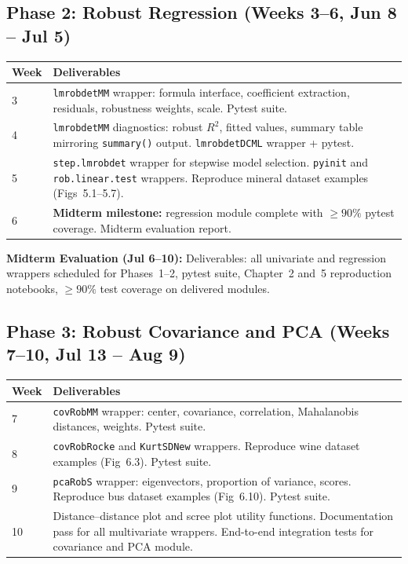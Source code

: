 \documentclass[11pt, a4paper]{article}
\begin{document}
\subsection{Phase 2: Robust Regression (Weeks 3--6, Jun 8 -- Jul 5)}

\begin{tabularx}{\linewidth}{@{} l X @{}}
  \toprule
  \textbf{Week} & \textbf{Deliverables} \\
  \midrule
  3 & \texttt{lmrobdetMM} wrapper: formula interface, coefficient
    extraction, residuals, robustness weights, scale.
    Pytest suite. \\
  4 & \texttt{lmrobdetMM} diagnostics: robust $R^2$, fitted values,
    summary table mirroring \texttt{summary()} output.
    \texttt{lmrobdetDCML} wrapper + pytest. \\
  5 & \texttt{step.lmrobdet} wrapper for stepwise model selection.
    \texttt{pyinit} and \texttt{rob.linear.test} wrappers.
    Reproduce mineral dataset examples (Figs~5.1--5.7). \\
  6 & \textbf{Midterm milestone:} regression module complete with
    $\geq 90\%$ pytest coverage. Midterm evaluation report. \\
  \bottomrule
\end{tabularx}

\vspace{0.3em}
\noindent\textbf{Midterm Evaluation (Jul 6--10):}
Deliverables: all univariate and regression wrappers scheduled for
Phases~1--2, pytest suite, Chapter~2 and~5 reproduction notebooks,
$\geq 90\%$ test coverage on delivered modules.

\subsection{Phase 3: Robust Covariance and PCA (Weeks 7--10, Jul 13 -- Aug 9)}

\begin{tabularx}{\linewidth}{@{} l X @{}}
  \toprule
  \textbf{Week} & \textbf{Deliverables} \\
  \midrule
  7  & \texttt{covRobMM} wrapper: center, covariance, correlation,
     Mahalanobis distances, weights. Pytest suite. \\
  8  & \texttt{covRobRocke} and \texttt{KurtSDNew} wrappers.
     Reproduce wine dataset examples (Fig~6.3). Pytest suite. \\
  9 & \texttt{pcaRobS} wrapper: eigenvectors, proportion of variance,
     scores. Reproduce bus dataset examples (Fig~6.10). Pytest suite. \\
  10 & Distance--distance plot and scree plot utility functions.
     Documentation pass for all multivariate wrappers.
     End-to-end integration tests for covariance and PCA module. \\
  \bottomrule
\end{tabularx}
\end{document}
